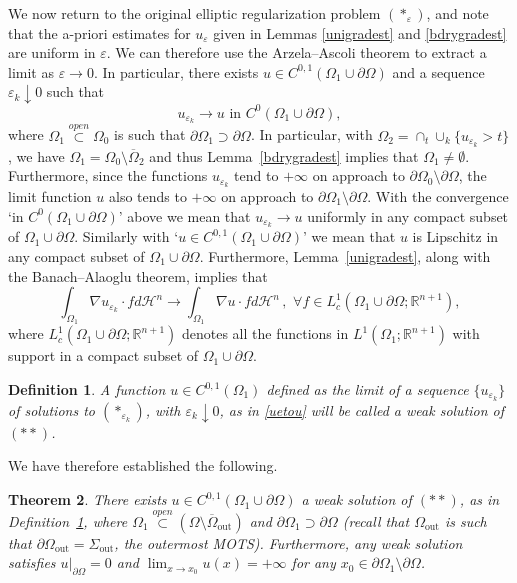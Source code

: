\documentclass[11pt]{amsart}
\newtheorem{Theorem}{Theorem}
\newtheorem{Definition}[Theorem]{Definition}
\renewcommand{\epsilon}{\varepsilon}
\def\R{\mathbb{R}}
\def\e{\epsilon}
\def\H{\mathcal{H}}
\def\ov{\overline}
\def\out{\text{out}}
\begin{document}
We now return to the original elliptic regularization problem $(*_{\varepsilon})$, and note that the a-priori estimates for $u_{\varepsilon}$ given in Lemmas \ref{unigradest} and \ref{bdrygradest}  are uniform in $\varepsilon$. We can therefore use the Arzela--Ascoli theorem to extract a limit as $\e\to 0$. In particular, there exists $u\in C^{0,1}(\Omega_1\cup\partial\Omega)$ and a sequence $\e_k\downarrow 0$ such that
\begin{equation}\label{uetou}
u_{\varepsilon_k}\to u \text{  in $C^0({\Omega_1}\cup\partial\Omega)$},
\end{equation}
 where $\Omega_1\stackrel{open}{\subset}\Omega_0$ is such that $\partial\Omega_1\supset\partial\Omega$. In particular, with $\Omega_2=\cap_t\cup _k\{u_{\e_k}>t\}$, we have $\Omega_1=\Omega_0\setminus\ov\Omega_2$ and thus Lemma~\ref{bdrygradest} implies that $\Omega_1\ne\emptyset$.  Furthermore, since the functions $u_{\e_k}$ tend to $+\infty$ on approach to $\partial\Omega_0\setminus\partial\Omega$, the limit function $u$ also tends to $+\infty$ on approach to  $\partial\Omega_1\setminus\partial\Omega$. With the convergence  `in $C^0({\Omega_1}\cup\partial\Omega)$' above we mean that $u_{\varepsilon_k}\to u$ uniformly in any compact subset of ${\Omega_1}\cup\partial\Omega$. Similarly with `$u\in C^{0,1}(\Omega_1\cup\partial\Omega)$' we mean that $u$ is Lipschitz in any compact subset of ${\Omega_1}\cup\partial\Omega$. Furthermore, Lemma~\ref{unigradest}, along with the Banach--Alaoglu theorem,  implies that 
\begin{equation}\label{Duetou}
\int_{\Omega_1}\nabla u_{\e_k}\cdot fd\H^n\to \int_{\Omega_1}\nabla u\cdot fd\H^n\,,\,\,\forall f\in L^1_c(\Omega_1\cup\partial\Omega;\R^{n+1}),
\end{equation}
where $L^1_c(\Omega_1\cup\partial\Omega;\R^{n+1})$ denotes all the functions in $L^1(\Omega_1;\R^{n+1})$ with support in a compact subset of $\Omega_1\cup\partial\Omega$. 


\begin{Definition}\label{weak} A function $u\in C^{0,1}(\Omega_1)$ defined as the limit of a sequence $\{u_{\varepsilon_k}\}$ of solutions to $(*_{\varepsilon_k})$, with $\e_k\downarrow 0$, as in \eqref{uetou} will be called a weak  solution of $(**)$. 
\end{Definition}
We have therefore established the following.
\begin{Theorem}\label{weak existence}
There exists $u\in C^{0,1}(\Omega_1\cup\partial\Omega)$ a weak solution of $(**)$, as in Definition~\ref{weak}, where $\Omega_1\stackrel{open}{\subset} (\Omega\setminus\ov\Omega_\out)$ and $\partial\Omega_1\supset\partial\Omega$ (recall that $\Omega_\out$ is such that $\partial\Omega_\out=\Sigma_\out$, the outermost MOTS). Furthermore, any weak solution satisfies $u|_{\partial\Omega}=0$ and $\lim_{x\to x_0} u(x)=+\infty$ for any $x_0\in\partial \Omega_1\setminus\partial\Omega$.
\end{Theorem}
\end{document}
